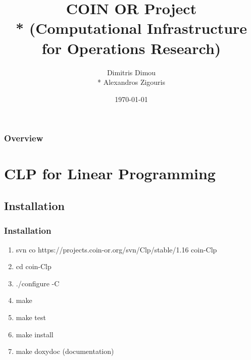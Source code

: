 \documentclass{beamer}
\title[COIN OR]{COIN OR Project \\* (Computational Infrastructure for Operations Research)} %
\author{Dimitris Dimou \\* Alexandros Zigouris} %
\institute[UP] %
{
University of Patras \\ %
\medskip
\textit{mijuomij@gmail.com} %
}
\date{\today} %
\begin{document}
\begin{frame}
\titlepage %
\end{frame}

\begin{frame}
\frametitle{Overview} %
\tableofcontents %
\end{frame}


\section{CLP for Linear Programming} %


\subsection{Installation} %


\begin{frame}
  \frametitle{Installation}
  \begin{enumerate}
    \item svn co https://projects.coin-or.org/svn/Clp/stable/1.16 coin-Clp
    \item cd coin-Clp
    \item ./configure -C
    \item make 
    \item make test
    \item make install
    \item make doxydoc (documentation)
  \end{enumerate}
\end{frame}
\end{document}
